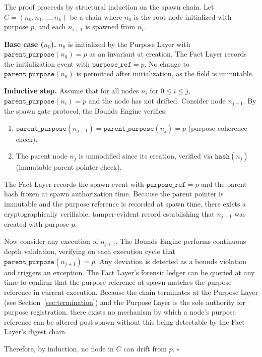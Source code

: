 \begin{ProofSketch}
The proof proceeds by structural induction on the spawn chain. Let $C = (n_0, n_1, \ldots, n_k)$ be a chain where $n_0$ is the root node initialized with purpose $p$, and each $n_{i+1}$ is spawned from $n_i$.

\textbf{Base case ($n_0$).} $n_0$ is initialized by the Purpose Layer with $\texttt{parent\_purpose}(n_0) = p$ as an invariant at creation. The Fact Layer records the initialization event with $\texttt{purpose\_ref} = p$. No change to $\texttt{parent\_purpose}(n_0)$ is permitted after initialization, as the field is immutable.

\textbf{Inductive step.} Assume that for all nodes $n_i$ for $0 \leq i \leq j$, $\texttt{parent\_purpose}(n_i) = p$ and the node has not drifted. Consider node $n_{j+1}$. By the spawn gate protocol, the Bounds Engine verifies:
\begin{enumerate}
    \item $\texttt{parent\_purpose}(n_{j+1}) = \texttt{parent\_purpose}(n_j) = p$ (purpose coherence check).
    \item The parent node $n_j$ is unmodified since its creation, verified via $\texttt{hash}(n_j)$ (immutable parent pointer check).
\end{enumerate}
The Fact Layer records the spawn event with $\texttt{purpose\_ref} = p$ and the parent hash frozen at spawn authorization time. Because the parent pointer is immutable and the purpose reference is recorded at spawn time, there exists a cryptographically verifiable, tamper-evident record establishing that $n_{j+1}$ was created with purpose $p$.

Now consider any execution of $n_{j+1}$. The Bounds Engine performs continuous depth validation, verifying on each execution cycle that $\texttt{parent\_purpose}(n_{j+1}) = p$. Any deviation is detected as a bounds violation and triggers an exception. The Fact Layer's forensic ledger can be queried at any time to confirm that the purpose reference at spawn matches the purpose reference in current execution. Because the chain terminates at the Purpose Layer (see Section~\ref{sec:termination}) and the Purpose Layer is the sole authority for purpose registration, there exists no mechanism by which a node's purpose reference can be altered post-spawn without this being detectable by the Fact Layer's digest chain.

Therefore, by induction, no node in $C$ can drift from $p$. $\square$
\end{ProofSketch}

